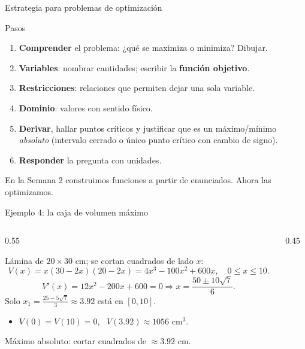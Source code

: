 \documentclass[10pt,aspectratio=169]{beamer}
\begin{document}
\begin{frame}{Estrategia para problemas de optimización}
  \begin{block}{Pasos}
    \begin{enumerate}
      \item \textbf{Comprender} el problema: ¿qué se maximiza o minimiza? Dibujar.
      \item \textbf{Variables}: nombrar cantidades; escribir la \textbf{función objetivo}.
      \item \textbf{Restricciones}: relaciones que permiten dejar una sola variable.
      \item \textbf{Dominio}: valores con sentido físico.
      \item \textbf{Derivar}, hallar puntos críticos y justificar que es un máximo/mínimo \emph{absoluto}
        (intervalo cerrado o único punto crítico con cambio de signo).
      \item \textbf{Responder} la pregunta con unidades.
    \end{enumerate}
  \end{block}
  \begin{idea}
    En la Semana 2 construimos funciones a partir de enunciados. Ahora las optimizamos.
  \end{idea}
\end{frame}

\begin{frame}{Ejemplo 4: la caja de volumen máximo}
  \begin{columns}
    \begin{column}{0.55\textwidth}
      \begin{ejemplo}
        Lámina de $20\times30$ cm; se cortan cuadrados de lado $x$:
        \[ V(x)=x(30-2x)(20-2x)=4x^3-100x^2+600x,\quad 0\le x\le10. \]
        \[ V'(x)=12x^2-200x+600=0\Rightarrow x=\frac{50\pm10\sqrt7}{6}. \]
        Solo $x_1=\frac{25-5\sqrt7}{3}\approx3.92$ está en $[0,10]$.
        \begin{itemize}
          \item $V(0)=V(10)=0$, \ $V(3.92)\approx1056$ cm$^3$.
        \end{itemize}
        Máximo absoluto: cortar cuadrados de $\approx3.92$ cm.
      \end{ejemplo}
    \end{column}
    \begin{column}{0.45\textwidth}
      \centering
    \end{column}
  \end{columns}
\end{frame}
\end{document}
